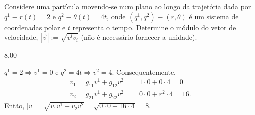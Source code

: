 \begin{question}
    Considere uma partícula movendo-se num plano ao longo da trajetória dada por $q^1 \equiv r(t) = 2$ e $q^2 \equiv \theta(t) = 4t$, onde $(q^1, q^2) \equiv (r,\theta)$ é um sistema de coordenadas polar e $t$ representa o tempo.
    Determine o módulo do vetor de velocidade, $|\vec v| := \sqrt{v^i v_i}$ (não é necessário fornecer a unidade).

    \begin{answer}
      8,00
    \end{answer}

    \begin{solution}
      $q^1 = 2 \Rightarrow v^1 = 0$ e $q^2 = 4t \Rightarrow v^2 = 4$.
      Consequentemente,
      \begin{align*}
        v_1 = g_{11} v^1 + g_{12} v^2 &= 1 \cdot 0 + 0 \cdot 4 = 0 \\
        v_2 = g_{21} v^1 + g_{22} v^2 &= 0 \cdot 0 + r^2 \cdot 4  = 16.
      \end{align*}
      Então, $|v| = \sqrt{v_1v^1 + v_2v^2} = \sqrt{0 \cdot 0 + 16 \cdot 4} = 8$.
    \end{solution}
\end{question}